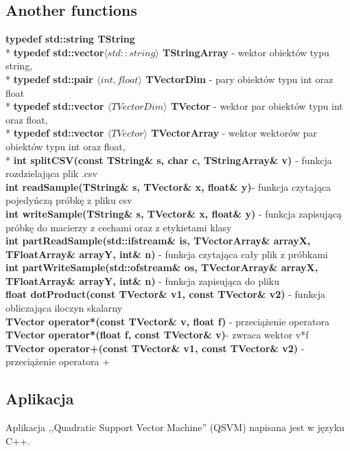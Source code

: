 \documentclass[11pt]{article}
\begin{document}
\begin{enumerate}
\subsection{Another functions}
\setlength{\parskip}{1ex plus 0.5ex minus 0.2ex}
\textbf{typedef std::string TString}\\*
\textbf{typedef std::vector$\langle std::string\rangle$ TStringArray} - wektor obiektów typu string,\\*	
\textbf{typedef std::pair $\langle int, float \rangle$ TVectorDim} - pary obiektów typu int oraz float\\*
\textbf{typedef std::vector $\langle TVectorDim \rangle$ TVector }- wektor par obiektów typu int oraz float,\\*
\textbf{typedef std::vector $\langle TVector \rangle$ TVectorArray} - wektor wektorów par obiektów typu int oraz float, \\*
\textbf{int splitCSV(const TString\& s, char c, TStringArray\& v)} - funkcja rozdzielająca plik .csv\\
\textbf{int readSample(TString\& s, TVector\& x, float\& y)}- funkcja czytająca pojedyńczą próbkę z pliku csv\\
\textbf{int writeSample(TString\& s, TVector\& x, float\& y)} - funkcja zapisującą próbkę do macierzy z cechami oraz z etykietami klasy\\
\textbf{int partReadSample(std::ifstream\& is, TVectorArray\& arrayX, TFloatArray\& arrayY, int\& n) }- funkcja czytająca cały plik z próbkami\\
\textbf{int partWriteSample(std::ofstream\& os, TVectorArray\& arrayX, TFloatArray\& arrayY, int\& n)} - funkcja zapisująca do pliku\\
\textbf{float dotProduct(const TVector\& v1, const TVector\& v2)} - funkcja obliczająca iloczyn skalarny\\
\textbf{TVector operator*(const TVector\& v, float f) }- przeciążenie operatora \\
\textbf{TVector operator*(float f, const TVector\& v)}- zwraca wektor v*f\\
\textbf{TVector operator+(const TVector\& v1, const TVector\& v2) }- przeciążenie operatora +\\

\subsection{Aplikacja}
\noindent Aplikacja ,,Quadratic Support Vector Machine'' (QSVM) napisana jest w języku C++.


\end{enumerate}
\end{document}
